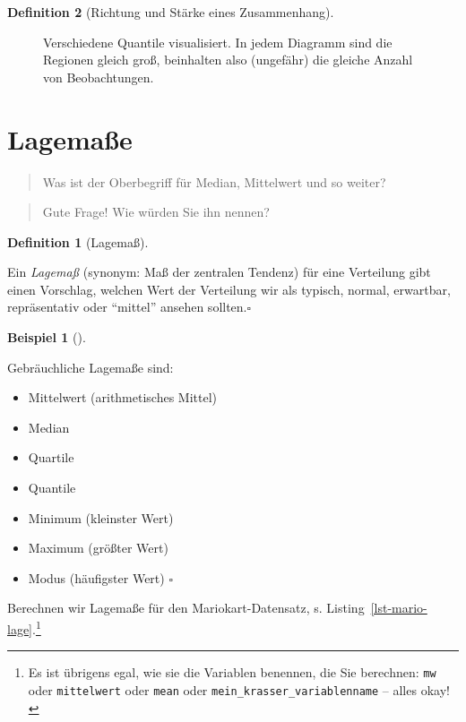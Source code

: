 \documentclass[
  a4paper,
  DIV=11]{scrreprt}
\providecommand{\tightlist}{%
  \setlength{\itemsep}{0pt}\setlength{\parskip}{0pt}}\usepackage{longtable,booktabs,array}
\theoremstyle{definition}
\theoremstyle{definition}
\newtheorem{example}{Beispiel}[chapter]
\theoremstyle{definition}
\newtheorem{definition}{Definition}[chapter]
\theoremstyle{remark}
\begin{document}
\begin{definition}[Richtung und Stärke eines
Zusammenhang]
\begin{figure}
{}

\caption{\label{fig-quantile-mosaic}Verschiedene Quantile visualisiert.
In jedem Diagramm sind die Regionen gleich groß, beinhalten also
(ungefähr) die gleiche Anzahl von Beobachtungen.}

\end{figure}%

\section{Lagemaße}\label{sec-lage}

\begin{quote}
{} Was ist der Oberbegriff für Median, Mittelwert und so
weiter?
\end{quote}

\begin{quote}
{} Gute Frage! Wie würden Sie ihn nennen?
\end{quote}

\begin{definition}[Lagemaß]\protect\hypertarget{def-lage}{}\label{def-lage}

Ein \emph{Lagemaß} (synonym: Maß der zentralen Tendenz) für eine
Verteilung gibt einen Vorschlag, welchen Wert der Verteilung wir als
typisch, normal, erwartbar, repräsentativ oder ``mittel'' ansehen
sollten.\(\square\)

\end{definition}

\begin{example}[]\protect\hypertarget{exm-lagemaße}{}\label{exm-lagemaße}

Gebräuchliche Lagemaße sind:

\begin{itemize}
\tightlist
\item
  Mittelwert (arithmetisches Mittel)
\item
  Median
\item
  Quartile
\item
  Quantile
\item
  Minimum (kleinster Wert)
\item
  Maximum (größter Wert)
\item
  Modus (häufigster Wert) \(\square\)
\end{itemize}

\end{example}

Berechnen wir Lagemaße für den Mariokart-Datensatz, s.
Listing~\ref{lst-mario-lage}.\footnote{Es ist übrigens egal, wie sie die
  Variablen benennen, die Sie berechnen: \texttt{mw} oder
  \texttt{mittelwert} oder \texttt{mean} oder
  \texttt{mein\_krasser\_variablenname} -- alles okay!}


\end{definition}
\end{document}
